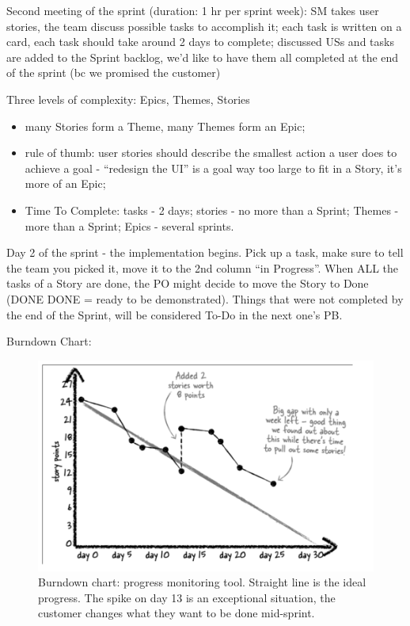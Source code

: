 \noindent Second meeting of the sprint (duration: 1 hr per sprint week): SM takes user stories, the team discuss possible tasks to accomplish it; each task is written on a card, each task should take around 2 days to complete; discussed USs and tasks are added to the Sprint backlog, we'd like to have them all completed at the end of the sprint (bc we promised the customer)

 \noindent Three levels of complexity: Epics, Themes, Stories
 \begin{itemize}
     \item many Stories form a Theme, many Themes form an Epic;
     \item rule of thumb: user stories should describe the smallest action a user does to achieve a goal - ``redesign the UI'' is a goal way too large to fit in a Story, it's more of an Epic;
     \item Time To Complete: tasks - 2 days; stories - no more than a Sprint; Themes - more than a Sprint; Epics - several sprints.
 \end{itemize}

 Day 2 of the sprint - the implementation begins. Pick up a task, make sure to tell the team you picked it, move it to the 2nd column ``in Progress''. When ALL the tasks of a Story are done, the PO might decide to move the Story to Done (DONE DONE = ready to be demonstrated). Things that were not completed by the end of the Sprint, will be considered To-Do in the next one's PB.

 \noindent Burndown Chart:
\begin{figure} [H]
    \centering
    \includegraphics[scale=0.4]{Figures/02/bdc.png}
    \caption{Burndown chart: progress monitoring tool. Straight line is the ideal progress. The spike on day 13 is an exceptional situation, the customer changes what they want to be done mid-sprint.}
    \label{fig:bdc}
\end{figure}

